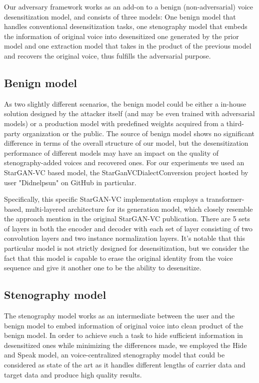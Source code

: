 \documentclass[journal]{IEEEtran} %
\begin{document}
Our adversary framework works as an add-on to a benign (non-adversarial) voice desensitization model, and consists of three models: One benign model that handles conventional desensitization tasks, one stenography model that embeds the information of original voice into desensitized one generated by the prior model and one extraction model that takes in the product of the previous model and recovers the original voice, thus fulfills the adversarial purpose.

\subsection{Benign model}

As two slightly different scenarios, the benign model could be either a in-house solution designed by the attacker itself (and may be even trained with adversarial models) or a production model with predefined weights acquired from a third-party organization or the public. The source of benign model shows no significant difference in terms of the overall structure of our model, but the desensitization performance of different models may have an impact on the quality of stenography-added voices and recovered ones. For our experiments we used an StarGAN-VC\cite{a3} based model,  the StarGanVCDialectConversion project hosted by user "Didnelpsun" on GitHub\cite{a2} in particular.

Specifically, this specific StarGAN-VC implementation employs a transformer-based, multi-layered architecture for its generation model, which closely resemble the approach mention in the original StarGAN-VC publication. There are 5 sets of layers in both the encoder and decoder with each set of layer consisting of two convolution layers and two instance normalization layers. It's notable that this particular model is not strictly designed for desensitization, but we consider the fact that this model is capable to erase the original identity from the voice sequence and give it another one to be the ability to desensitize.

\subsection{Stenography model}

The stenography model works as an intermediate between the user and the benign model to embed information of original voice into clean product of the benign model. In order to achieve such a task to hide sufficient information in desensitized ones while minimizing the differences made, we employed the Hide and Speak model\cite{a4}, an voice-centralized stenography model that could be considered as state of the art as it handles different lengths of carrier data and target data and produce high quality results.
\end{document}
